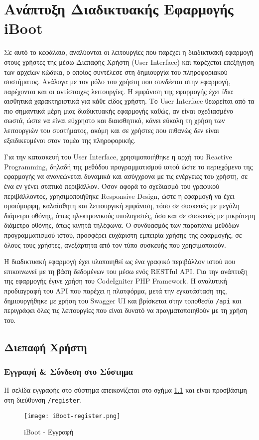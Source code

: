 \chapter{Ανάπτυξη Διαδικτυακής Εφαρμογής iBoot}
Σε αυτό το κεφάλαιο, αναλύονται οι λειτουργίες που παρέχει η διαδικτυακή εφαρμογή στους χρήστες της μέσω Διεπαφής Χρήστη (User Interface) και παρέχεται επεξήγηση των αρχείων κώδικα, ο οποίος συντέλεσε στη δημιουργία του πληροφοριακού συστήματος. Ανάλογα με τον ρόλο του χρήστη που συνδέεται στην εφαρμογή, παρέχονται και οι αντίστοιχες λειτουργίες. Η εμφάνιση της εφαρμογής έχει ίδια αισθητικά χαρακτηριστικά για κάθε είδος χρήστη. Το User Interface θεωρείται από τα πιο σημαντικά μέρη μιας διαδικτυακής εφαρμογής καθώς, αν είναι σχεδιασμένο σωστά, ώστε να είναι εύχρηστο και διαισθητικό, κάνει εύκολη τη χρήση των λειτουργιών του συστήματος, ακόμη και σε χρήστες που πιθανώς δεν είναι εξειδικευμένοι στον τομέα της πληροφορικής.

Για την κατασκευή του User Interface, χρησιμοποιήθηκε η αρχή του Reactive Programming, δηλαδή της μεθόδου προγραμματισμού ιστού ώστε το περιεχόμενο της εφαρμογής να ανανεώνεται δυναμικά και ασύγχρονα με τις ενέργειες του χρήστη, σε ένα εν γένει στατικό περιβάλλον. Όσον αφορά το σχεδιασμό του γραφικού περιβάλλοντος, χρησιμοποιήθηκε Responsive Design, ώστε η εφαρμογή να έχει ομοιόμορφη, καλαίσθητη και λειτουργική εμφάνιση, τόσο σε συσκευές με μεγάλη διάμετρο οθόνης, όπως ηλεκτρονικούς υπολογιστές, όσο και σε συσκευές με μικρότερη διάμετρο οθόνης, όπως κινητά τηλέφωνα. Ο συνδυασμός των παραπάνω μεθόδων προγραμματισμού ιστού, προσφέρει ευχάριστη εμπειρία χρήσης της εφαρμογής, σε όλους τους χρήστες, ανεξάρτητα από τον τύπο συσκευής που χρησιμοποιούν.

Η διαδικτυακή εφαρμογή έχει υλοποιηθεί ως ένα γραφικό περιβάλλον ιστού που επικοινωνεί με τη βάση δεδομένων του μέσω ενός RESTful API. Για την ανάπτυξη της εφαρμογής έγινε χρήση του CodeIgniter PHP Framework. Η αναλυτική προδιαγραφή του API που παρέχει η πλατφόρμα, μετά την εγκατάσταση της, δημιουργήθηκε με χρήση του Swagger UI και βρίσκεται στην τοποθεσία \texttt{/api} και περιγράφει όλες τις λειτουργίες που είναι δυνατό να πραγματοποιηθούν με τη χρήση του.

\section{Διεπαφή Χρήστη}

\subsection{Εγγραφή \& Σύνδεση στο Σύστημα}
\FloatBarrier
Η σελίδα εγγραφής στο σύστημα απεικονίζεται στο σχήμα \ref{fig:iBoot_register} και είναι προσβάσιμη στη διεύθυνση \verb!/register!.
\begin{figure}[ht]
	\centering
	\texttt{[image: iBoot-register.png]}
	\caption{iBoot - Εγγραφή}
	\label{fig:iBoot_register}
\end{figure}

